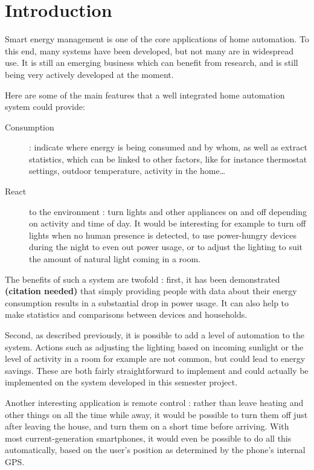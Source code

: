 \section*{Introduction}
Smart energy management is one of the core applications of home automation. To
this end, many systems have been developed, but not many are in widespread use.
It is still an emerging business which can benefit from research, and is still
being very actively developed at the moment.

Here are some of the main features that a well integrated home automation system
could provide:
\begin{description}
  \item[Consumption] : indicate where energy is being consumed and by whom, as
    well as extract statistics, which can be linked to other factors, like for
    instance thermostat settings, outdoor temperature, activity in the
    home\ldots
  \item[React] to the environment : turn lights and other appliances on and off
    depending on activity and time of day. It would be interesting for example
    to turn off lights when no human presence is detected, to use power-hungry
    devices during the night to even out power usage, or to adjust the lighting
    to suit the amount of natural light coming in a room. 
\end{description}

The benefits of such a system are twofold : first, it has been demonstrated
\textbf{(citation needed)} that simply providing people with data about their
energy consumption results in a substantial drop in power usage. It can also
help to make statistics and comparisons between devices and households.

Second, as described previously, it is possible to add a level of automation to
the system. Actions such as adjusting the lighting based on incoming sunlight or
the level of activity in a room for example are not common, but could lead to
energy savings. These are both fairly straightforward to implement and could
actually be implemented on the system developed in this semester project.

Another interesting application is remote control : rather than leave heating
and other things on all the time while away, it would be possible to turn them
off just after leaving the house, and turn them on a short time before arriving.
With most current-generation smartphones, it would even be possible to do all
this automatically, based on the user's position as determined by the phone's
internal GPS.


